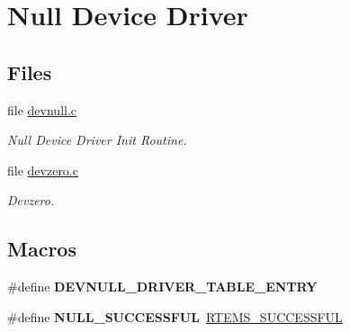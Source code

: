 \hypertarget{group__libmisc__devnull}{}\section{Null Device Driver}
\label{group__libmisc__devnull}
\subsection*{Files}
\begin{DoxyCompactItemize}
\item 
file \mbox{\hyperlink{devnull_8c}{devnull.\+c}}
\begin{DoxyCompactList}\small\item\em Null Device Driver Init Routine. \end{DoxyCompactList}\item 
file \mbox{\hyperlink{devzero_8c}{devzero.\+c}}
\begin{DoxyCompactList}\small\item\em Devzero. \end{DoxyCompactList}\end{DoxyCompactItemize}
\subsection*{Macros}
\begin{DoxyCompactItemize}
\item 
\#define {\bfseries D\+E\+V\+N\+U\+L\+L\+\_\+\+D\+R\+I\+V\+E\+R\+\_\+\+T\+A\+B\+L\+E\+\_\+\+E\+N\+T\+RY}
\item 
\mbox{\label{group__libmisc__devnull_ga85bf73b3639544db1575c694fdfa8d54}} 
\#define {\bfseries N\+U\+L\+L\+\_\+\+S\+U\+C\+C\+E\+S\+S\+F\+UL}~\mbox{\hyperlink{group__ClassicStatus_gga545d41846817eaba6143d52ee4d9e9fea8a23e2d94778f09399da984d73562536}{R\+T\+E\+M\+S\+\_\+\+S\+U\+C\+C\+E\+S\+S\+F\+UL}}
\end{DoxyCompactItemize}
